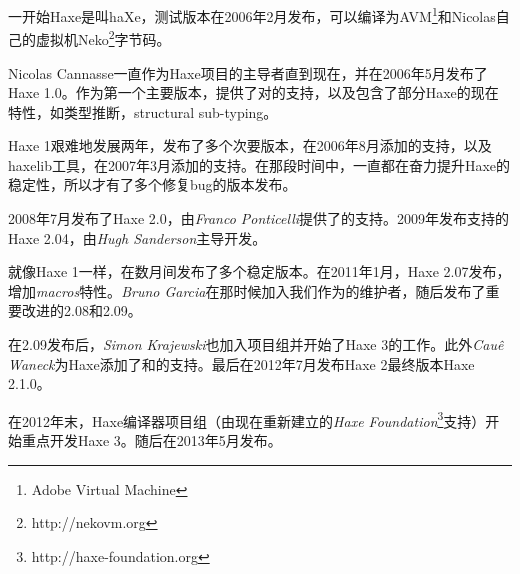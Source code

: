 一开始Haxe是叫haXe，测试版本在2006年2月发布，可以编译为AVM\footnote{Adobe Virtual Machine}和Nicolas自己的虚拟机Neko\footnote{http://nekovm.org}字节码。

Nicolas Cannasse一直作为Haxe项目的主导者直到现在，并在2006年5月发布了Haxe 1.0。作为第一个主要版本，提供了对的支持，以及包含了部分Haxe的现在特性，如类型推断，structural sub-typing。

Haxe 1艰难地发展两年，发布了多个次要版本，在2006年8月添加的支持，以及haxelib工具，在2007年3月添加的支持。在那段时间中，一直都在奋力提升Haxe的稳定性，所以才有了多个修复bug的版本发布。

2008年7月发布了Haxe 2.0，由\emph{Franco Ponticelli}提供了的支持。2009年发布支持的Haxe 2.04，由\emph{Hugh Sanderson}主导开发。

就像Haxe 1一样，在数月间发布了多个稳定版本。在2011年1月，Haxe 2.07发布，增加\emph{macros}特性。\emph{Bruno Garcia}在那时候加入我们作为的维护者，随后发布了重要改进的2.08和2.09。

在2.09发布后，\emph{Simon Krajewski}也加入项目组并开始了Haxe 3的工作。此外\emph{Cau\^{e} Waneck}为Haxe添加了和的支持。最后在2012年7月发布Haxe 2最终版本Haxe 2.1.0。

在2012年末，Haxe编译器项目组（由现在重新建立的\emph{Haxe Foundation}\footnote{http://haxe-foundation.org}支持）开始重点开发Haxe 3。随后在2013年5月发布。

